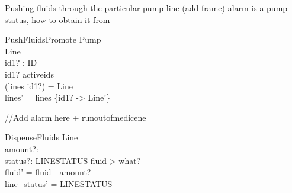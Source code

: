 \documentclass{article}
\begin{document}
	
	Pushing fluids through the particular pump line (add frame) alarm is a pump status, how to obtain it from
	
	\begin{schema}{PushFluidsPromote}
		\Delta Pump	\\
		\Delta Line \\
		id1? : ID \\
	\where 
		id1? \in activeids \\
		(lines id1?) = \theta Line \\
		lines' = lines \oplus \{id1? -> \theta Line'\} \\		
	\end{schema}
	
	//Add alarm here + runoutofmedicene
	\begin{schema}{DispenseFluids}
		\Delta Line \\
		amount?: \nat \\
		status?: LINESTATUS
	\where 
		fluid > what? \\
		fluid' = fluid - amount? \\
		line_status' = LINESTATUS
	\end{schema}
\end{document}
